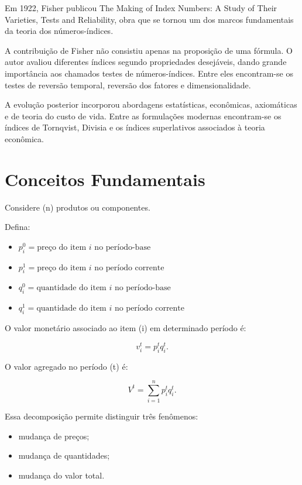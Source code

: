 Em 1922, Fisher publicou The Making of Index Numbers: A Study of Their Varieties, Tests and Reliability, obra que se tornou um dos marcos fundamentais da teoria dos números-índices. \vskip0.3cm

A contribuição de Fisher não consistiu apenas na proposição de uma fórmula. O autor avaliou diferentes índices segundo propriedades desejáveis, dando grande importância aos chamados testes de números-índices. Entre eles encontram-se os testes de reversão temporal, reversão dos fatores e dimensionalidade. \vskip0.3cm

A evolução posterior incorporou abordagens estatísticas, econômicas, axiomáticas e de teoria do custo de vida. Entre as formulações modernas encontram-se os índices de Tornqvist, Divisia e os índices superlativos associados à teoria econômica.


\section{Conceitos Fundamentais}

Considere (n) produtos ou componentes.\vskip0.3cm

Defina:

\begin{itemize}
    \item $p_i^0 = \text{preço do item }i\text{ no período-base}$
    \item $p_i^1 = \text{preço do item }i\text{ no período corrente}$
    \item $q_i^0 = \text{quantidade do item }i\text{ no período-base}$
    \item $q_i^1 = \text{quantidade do item }i\text{ no período corrente}$
\end{itemize}

O valor monetário associado ao item (i) em determinado período é:

$$
v_i^t=p_i^tq_i^t.
$$

O valor agregado no período (t) é:

$$
V^t=\sum_{i=1}^{n}p_i^tq_i^t.
$$

Essa decomposição permite distinguir três fenômenos:

\begin{itemize}
    \item mudança de preços;
    \item mudança de quantidades;
    \item mudança do valor total.
\end{itemize}

